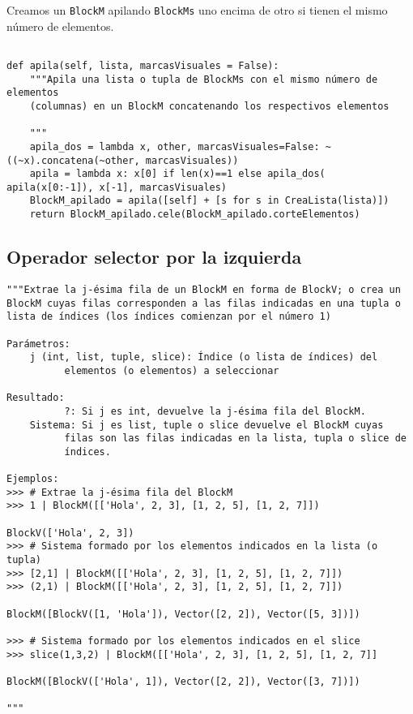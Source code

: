 \documentclass[11pt]{report}
\begin{document}
Creamos un \texttt{BlockM} apilando \texttt{BlockMs} uno encima de otro si tienen el
mismo número de elementos.
\begin{verbatim}

def apila(self, lista, marcasVisuales = False):
    """Apila una lista o tupla de BlockMs con el mismo número de elementos
    (columnas) en un BlockM concatenando los respectivos elementos

    """
    apila_dos = lambda x, other, marcasVisuales=False: ~((~x).concatena(~other, marcasVisuales))
    apila = lambda x: x[0] if len(x)==1 else apila_dos( apila(x[0:-1]), x[-1], marcasVisuales)
    BlockM_apilado = apila([self] + [s for s in CreaLista(lista)])
    return BlockM_apilado.cele(BlockM_apilado.corteElementos)

\end{verbatim}

\subsection{Operador selector por la izquierda}
\label{sec:org0312354}

\begin{verbatim}
"""Extrae la j-ésima fila de un BlockM en forma de BlockV; o crea un
BlockM cuyas filas corresponden a las filas indicadas en una tupla o
lista de índices (los índices comienzan por el número 1)

Parámetros:
    j (int, list, tuple, slice): Índice (o lista de índices) del 
          elementos (o elementos) a seleccionar

Resultado:
          ?: Si j es int, devuelve la j-ésima fila del BlockM.
    Sistema: Si j es list, tuple o slice devuelve el BlockM cuyas
          filas son las filas indicadas en la lista, tupla o slice de
          índices.

Ejemplos:
>>> # Extrae la j-ésima fila del BlockM 
>>> 1 | BlockM([['Hola', 2, 3], [1, 2, 5], [1, 2, 7]])

BlockV(['Hola', 2, 3])
>>> # Sistema formado por los elementos indicados en la lista (o tupla)
>>> [2,1] | BlockM([['Hola', 2, 3], [1, 2, 5], [1, 2, 7]])
>>> (2,1) | BlockM([['Hola', 2, 3], [1, 2, 5], [1, 2, 7]])

BlockM([BlockV([1, 'Hola']), Vector([2, 2]), Vector([5, 3])])

>>> # Sistema formado por los elementos indicados en el slice
>>> slice(1,3,2) | BlockM([['Hola', 2, 3], [1, 2, 5], [1, 2, 7]]

BlockM([BlockV(['Hola', 1]), Vector([2, 2]), Vector([3, 7])])

"""
\end{verbatim}
\end{document}
